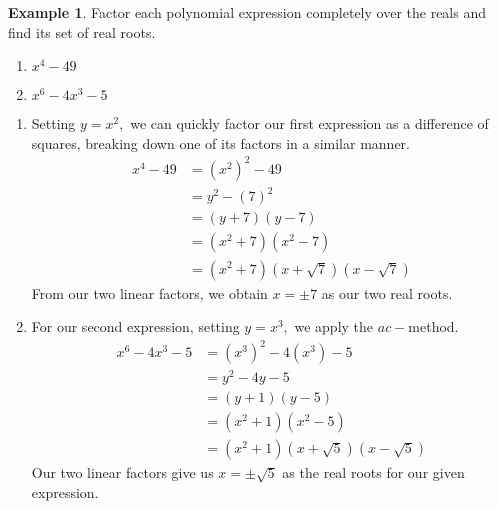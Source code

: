 \documentclass[12pt]{book}
\theoremstyle{definition}
\newtheorem{example}{Example}
\begin{document}
\begin{example} Factor each polynomial expression completely over the reals and find its set of real roots.
\begin{multicols}{2}
\begin{enumerate}
\item $x^4-49$
\item $x^6-4x^3-5$
\end{enumerate}
\end{multicols}
\begin{enumerate}
\item Setting $y=x^2,$ we can quickly factor our first expression as a difference of squares, breaking down one of its factors in a similar manner.
\begin{equation*}
\begin{split}
x^4-49&=\left(x^2\right)^2-49\\
&=y^2-\left(7\right)^2\\
&=\left(y+7\right)\left(y-7\right)\\
&=\left(x^2+7\right)\left(x^2-7\right)\\
&=\left(x^2+7\right)\left(x+\sqrt{7}\right)\left(x-\sqrt{7}\right)
\end{split}
\end{equation*}
From our two linear factors, we obtain $x=\pm 7$ as our two real roots.
\item For our second expression, setting $y=x^3,$ we apply the $ac-$method.
\begin{equation*}
\begin{split}
x^6-4x^3-5&=\left(x^3\right)^2-4\left(x^3\right)-5\\
&=y^2-4y-5\\
&=\left(y+1\right)\left(y-5\right)\\
&=\left(x^2+1\right)\left(x^2-5\right)\\
&=\left(x^2+1\right)\left(x+\sqrt{5}\right)\left(x-\sqrt{5}\right)
\end{split}
\end{equation*}
Our two linear factors give us $x=\pm \sqrt{5}$ as the real roots for our given expression.
\end{enumerate}
\end{example}
\end{document}
